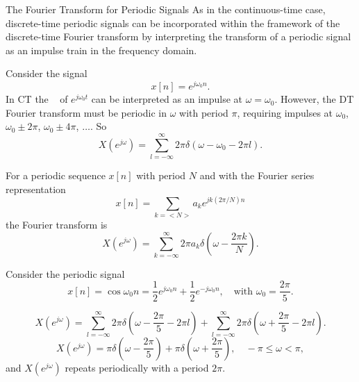 \begin{frame}{The Fourier Transform for Periodic Signals}
As in the continuous-time case, discrete-time periodic signals can be incorporated within
the framework of the discrete-time Fourier transform by interpreting the transform of a
periodic signal as an impulse train in the frequency domain.

Consider the signal
\begin{equation*}
    x[n] = e^{j\omega_0 n}.
\end{equation*}
 In CT the \ft~ of $e^{j\omega_0 t}$ can be interpreted as an impulse at $\omega = \omega_0$. However, the DT Fourier transform must
be periodic in $\omega$ with period $\pi$, requiring impulses at $\omega_0$,  $\omega_0 \pm 2\pi$, $\omega_0 \pm 4\pi$, $\dots$. So
\begin{equation*}
    X(e^{j\omega}) = \sum_{l=-\infty}^{\infty} 2\pi \delta (\omega - \omega_0 - 2\pi l).
\end{equation*}
    \begin{figure}
        \centering
        
    \end{figure}
\end{frame}

\begin{frame}
    {
    For a periodic sequence $x[n]$ with period $N$ and with the Fourier series representation
    \begin{equation*}
        x[n] = \sum_{k=<N>}a_k e^{jk(2\pi/N)n}
    \end{equation*}
    the Fourier transform is
    \begin{equation*}
        X(e^{j\omega}) = \sum_{k=-\infty}^{\infty} 2\pi a_k\delta \left(\omega - \frac{2\pi k}{N} \right).
    \end{equation*}
    }
\end{frame}


\begin{frame}
    \begin{example}
        Consider the periodic signal
        \begin{equation*}
            x[n] = \cos \omega_0 n = \frac{1}{2}e^{j\omega_0 n} +\frac{1}{2}e^{-j\omega_0 n}, \quad \text{with~} \omega_0 = \frac{2\pi}{5}.
        \end{equation*}
    \end{example}

    {
    	\begin{equation*}
	    	X(e^{j\omega}) = \sum_{l=-\infty}^{\infty} 2\pi \delta \left(\omega - \frac{2\pi}{5} - 2\pi l\right) +\sum_{l=-\infty}^{\infty} 2\pi \delta \left(\omega + \frac{2\pi}{5} - 2\pi l \right).    		
    	\end{equation*}
    	\pause
    	\begin{equation*}
    		X(e^{j\omega}) = \pi \delta \left(\omega - \frac{2\pi}{5}\right) + \pi \delta \left(\omega + \frac{2\pi}{5}\right), \quad -\pi \leq \omega < \pi,
    	\end{equation*}
    	and $X(e^{j\omega})$ repeats periodically with a period $2\pi$.

    }
\end{frame}


